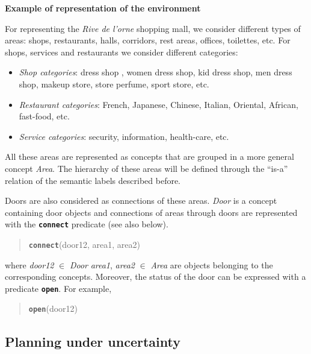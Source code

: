 


\vspace{1em}

\noindent 
\textbf{Example of representation of the environment}

For representing the \emph{Rive de l'orne} shopping mall, we consider different types of areas: shops, restaurants, halls, corridors, rest areas, offices, toilettes, etc. For shops, services and restaurants we consider different categories:
\begin{itemize}
\item {\it Shop categories}: dress shop , women dress shop, kid dress shop, men dress shop, makeup store, store perfume, sport store, etc.
\item {\it Restaurant categories}: French, Japanese, Chinese, Italian, Oriental, African, fast-food, etc.
\item {\it Service categories}: security, information, health-care, etc.
\end{itemize}

All these areas are represented as concepts that are grouped in a more general concept \emph{Area}. The hierarchy of these areas will be defined through the ``is-a'' relation of the semantic labels described before.

Doors are also considered as connections of these areas. \emph{Door} is a concept containing door objects and connections of areas through doors are represented with the {\tt\bf connect} predicate (see also below).

\begin{quote}
{\tt\bf connect}(door12, area1, area2)
\end{quote}

\noindent
where \emph{door12} $\in$ \emph{Door} \emph{area1}, \emph{area2} $\in$ \emph{Area}  are objects belonging to the corresponding concepts. Moreover, the status of the door can be expressed with a predicate {\tt\bf open}. For example,

\begin{quote}
{\tt\bf open}(door12) \\
\end{quote}





\subsection{Planning under uncertainty}

